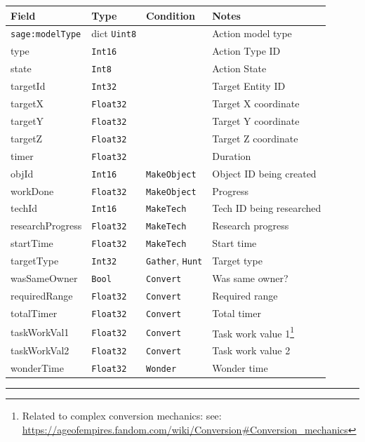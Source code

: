 \begin{longtable}{@{}p{}p{}p{}p{}@{}}
  \toprule
  Field & Type & Condition & Notes \\
  \midrule
  \endhead
  \texttt{sage:modelType} & dict \texttt{Uint8} & & Action model type \\
  type & \texttt{Int16} & & Action Type ID \\
  state & \texttt{Int8} & & Action State \\
  targetId & \texttt{Int32} & & Target Entity ID \\
  targetX & \texttt{Float32} & & Target X coordinate \\
  targetY & \texttt{Float32} & & Target Y coordinate \\
  targetZ & \texttt{Float32} & & Target Z coordinate \\
  timer & \texttt{Float32} & & Duration \\
  objId & \texttt{Int16} & \texttt{MakeObject} & Object ID being created \\
  workDone & \texttt{Float32} & \texttt{MakeObject} & Progress \\
  techId & \texttt{Int16} & \texttt{MakeTech} & Tech ID being researched \\
  researchProgress & \texttt{Float32} & \texttt{MakeTech} & Research progress \\
  startTime & \texttt{Float32} & \texttt{MakeTech} & Start time \\
  targetType & \texttt{Int32} & \texttt{Gather}, \texttt{Hunt} & Target type \\
  wasSameOwner & \texttt{Bool} & \texttt{Convert} & Was same owner? \\
  requiredRange & \texttt{Float32} & \texttt{Convert} & Required range \\
  totalTimer & \texttt{Float32} & \texttt{Convert} & Total timer \\
  taskWorkVal1 & \texttt{Float32} & \texttt{Convert} & Task work value 1\footnote{Related to complex conversion mechanics: see: \url{https://ageofempires.fandom.com/wiki/Conversion\#Conversion_mechanics}} \\
  taskWorkVal2 & \texttt{Float32} & \texttt{Convert} & Task work value 2 \\
  wonderTime & \texttt{Float32} & \texttt{Wonder} & Wonder time \\
  \bottomrule
\end{longtable}

\par\noindent\rule{\textwidth}{0.4pt}

